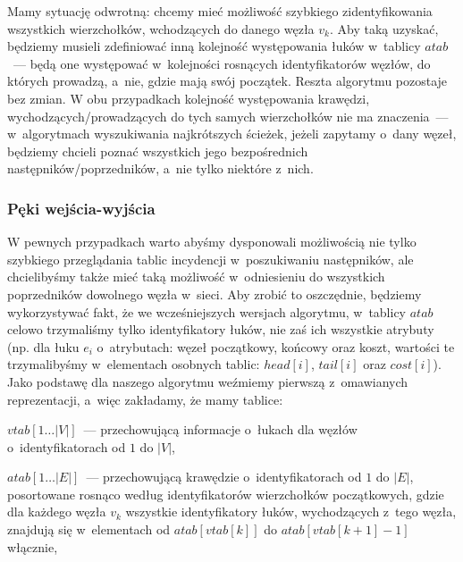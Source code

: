Mamy sytuację odwrotną: chcemy mieć możliwość szybkiego zidentyfikowania wszystkich wierzchołków, wchodzących do danego węzła $v_{k}$. Aby taką uzyskać, będziemy musieli zdefiniować inną kolejność występowania łuków w~tablicy $atab$~---  będą one występować w~kolejności rosnących identyfikatorów węzłów, do których prowadzą, a~nie, gdzie mają swój początek. Reszta algorytmu pozostaje bez zmian. W obu przypadkach kolejność występowania krawędzi, wychodzących/prowadzących do tych samych wierzchołków nie ma znaczenia~---  w~algorytmach wyszukiwania najkrótszych ścieżek, jeżeli zapytamy o~dany węzeł, będziemy chcieli poznać wszystkich jego bezpośrednich następników/poprzedników, a~nie tylko niektóre z~nich.

\subsubsection{Pęki wejścia-wyjścia}

W pewnych przypadkach warto abyśmy dysponowali możliwością nie tylko szybkiego przeglądania tablic incydencji w~poszukiwaniu następników, ale chcielibyśmy także mieć taką możliwość w~odniesieniu do wszystkich poprzedników dowolnego węzła w~sieci. Aby zrobić to oszczędnie, będziemy wykorzystywać fakt, że we wcześniejszych wersjach algorytmu, w~tablicy $atab$ celowo trzymaliśmy tylko identyfikatory łuków, nie zaś ich wszystkie atrybuty (np. dla łuku $e_{i}$ o~atrybutach: węzeł początkowy, końcowy oraz koszt, wartości te trzymalibyśmy w~elementach osobnych tablic: $head \left[ i \right] $,  $tail \left[ i \right] $ oraz  $cost \left[ i \right] $). Jako podstawę dla naszego algorytmu weźmiemy pierwszą z~omawianych reprezentacji, a~więc zakładamy, że mamy tablice:

\begin{myitemize}
	\item $ vtab \left[ 1 \ldots \left| V \right| \right] $~---  przechowującą informacje o~łukach dla węzłów o~identyfikatorach od $1$ do $ \left| V \right| $,
	\item $atab \left[ 1 \ldots \left| E \right| \right] $~---  przechowującą krawędzie o~identyfikatorach od $1$ do $ \left| E \right| $, posortowane rosnąco według identyfikatorów wierzchołków początkowych, gdzie dla każdego węzła $v_{k}$ wszystkie identyfikatory łuków, wychodzących z~tego węzła, znajdują się w~elementach od $atab \left[ vtab \left[ k \right] \right] $ do $atab \left[ vtab \left[ k+1 \right] -1 \right] $ włącznie,
\end{myitemize}

